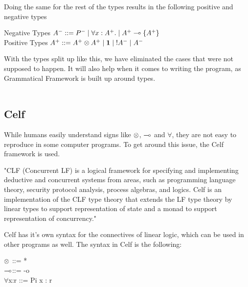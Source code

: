 Doing the same for the rest of the types results in the following positive and negative types
\begin{texto}
Negative Types $A^- ::= P^- \; | \; \forall x:A^+. \; | \; A^+ \multimap \{ A^+ \}$\\
Positive Types \hspace{0.8pt} $A^+ ::= A^+ \otimes A^+ \; | \; \mathord{\text{\rm\bf 1}} \; | \; \mathord{\text{\rm !}} A^- \; | \; A^-$
\end{texto}
With the types split up like this, we have eliminated the cases that were not supposed to happen. It will also help when it comes to writing the program, as Grammatical Framework is built up around types.
\\ 
\\ 

\subsection{Celf}
\label{LL_03}

While humans easily understand signs like $\otimes$, $\multimap$ and $\forall$, they are not easy to reproduce in some computer programs. To get around this issue, the Celf framework is used. 

"CLF (Concurrent LF) is a logical framework for specifying and implementing deductive and concurrent systems from areas, such as programming language theory, security protocol analysis, process algebras, and logics. Celf is an implementation of the CLF type theory that extends the LF type theory by linear types to support representation of state and a monad to support representation of concurrency."\cite{Celf}

Celf has it's own syntax for the connectives of linear logic, which can be used in other programs as well. The syntax in Celf is the following:
\begin{texto}
	$\otimes$\hspace{10pt} ::= * \\
	$\multimap$\hspace{10pt}::= -o \\
	$\forall$x:r ::= Pi x : r
\end{texto}

